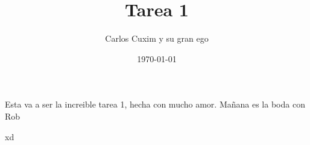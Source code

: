\documentclass[11pt]{article}
\title{Tarea 1}
\author{Carlos Cuxim y su gran ego}
\date{\today}
\begin{document}
\maketitle

Esta va a ser la increible tarea 1, hecha con mucho amor.
Mañana es la boda con Rob

xd
\end{document}
